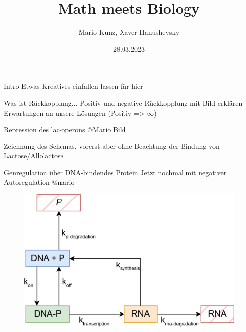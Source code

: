 \documentclass[11pt,aspectratio=169,reqno]{beamer}
\title{Math meets Biology}
\date[28.03.2023]{28.03.2023}
\author{Mario Kunz, Xaver Hanushevsky}
\institute{D-BIOL}
\begin{document}
\titleframe

\begin{frame}[fragile]{Intro}
    Etwas Kreatives einfallen lassen für hier
\end{frame}

\begin{frame}{Was ist Rückkopplung...}
Positiv und negative Rückkopplung mit Bild erklären
Erwartungen an unsere Lösungen (Positiv => $\infty$)
\end{frame}

\begin{frame}{Repression des lac-operons}
@Mario Bild

Zeichnung des Schemas, vorerst aber ohne Beachtung der Bindung von Lactose/Allolactose
\end{frame}

\begin{frame}{Genregulation über DNA-bindendes Protein}
    Jetzt nochmal mit negativer Autoregulation @mario

    \begin{figure}
        \centering
        \includegraphics[width=.6\textwidth]{images/gene_regulation_overview.png}
        \label{fig:my_label}
    \end{figure}
\end{frame}
\end{document}

